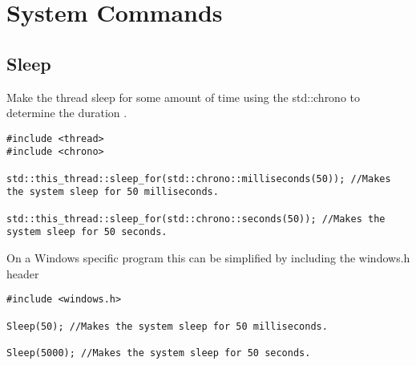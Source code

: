 \section{System Commands}

\subsection*{Sleep}
Make the thread sleep for some amount of time using the std::chrono to determine the duration \cite{cpp:chrono}.
\begin{lstlisting}
#include <thread>
#include <chrono>

std::this_thread::sleep_for(std::chrono::milliseconds(50)); //Makes the system sleep for 50 milliseconds.

std::this_thread::sleep_for(std::chrono::seconds(50)); //Makes the system sleep for 50 seconds.
\end{lstlisting}

On a Windows specific program this can be simplified by including the windows.h header
\begin{lstlisting}
#include <windows.h>

Sleep(50); //Makes the system sleep for 50 milliseconds.

Sleep(5000); //Makes the system sleep for 50 seconds.
\end{lstlisting}

